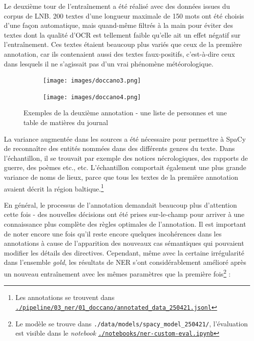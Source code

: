 \documentclass[a4paper,twoside,12pt]{article}
\begin{document}
Le deuxième tour de l'entraînement a été réalisé avec des données issues du corpus de LNB. 200 textes d'une longueur maximale de 150 mots ont été choisis d'une façon automatique, mais quand-même filtrés à la main pour éviter des textes dont la qualité d'OCR est tellement faible qu'elle ait un effet négatif sur l'entraînement. Ces textes étaient beaucoup plus variés que ceux de la première annotation, car ils contenaient aussi des textes faux-positifs, c’est-à-dire ceux dans lesquels il ne s’agissait pas d’un vrai phénomène météorologique.

\begin{figure}[!h]
\begin{subfigure}
\centering
    \texttt{[image: images/doccano3.png]}
\end{subfigure}
\begin{subfigure}
\centering
    \texttt{[image: images/doccano4.png]}
\end{subfigure}
\caption{Exemples de la deuxième annotation - une liste de personnes et une table de matières du journal}
\label{fig:doccano3_4}
\end{figure}

La variance augmentée dans les sources a été nécessaire pour permettre à SpaCy de reconnaître des entités nommées dans des différents genres du texte. Dans l’échantillon, il se trouvait par exemple des notices nécrologiques, des rapports de guerre, des poèmes etc., etc. L'échantillon comportait également une plus grande variance de noms de lieux, parce que tous les textes de la première annotation avaient décrit la région baltique.\footnote{Les annotations se trouvent dans \href{https://github.com/krkryger/clim-dist/blob/main/pipeline/03_ner/01_doccano/annotated_data_250421.jsonl}{\texttt{./pipeline/03\_ner/01\_doccano/annotated\_data\_250421.jsonl}}}

En général, le processus de l'annotation demandait beaucoup plus d'attention cette fois - des nouvelles décisions ont été prises sur-le-champ pour arriver à une connaissance plus complète des règles optimales de l'annotation. Il est important de noter encore une fois qu'il reste encore quelques incohérences dans les annotations à cause de l'apparition des nouveaux cas sémantiques qui pouvaient modifier les détails des directives. Cependant, même avec la certaine irrégularité dans l'ensemble \textit{gold}, les résultats de NER s'ont considérablement amélioré après un nouveau entraînement avec les mêmes paramètres que la première fois\footnote{Le modèle se trouve dans \texttt{./data/models/spacy\_model\_250421/}, l'évaluation est visible dans le \textit{notebook} \href{https://github.com/krkryger/clim-dist/blob/main/notebooks/ner-custom-eval.ipynb}{\texttt{./notebooks/ner-custom-eval.ipynb}}} :
\end{document}
